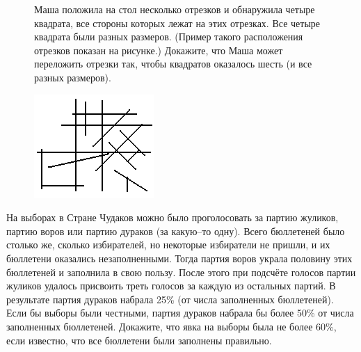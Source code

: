 \begin{figure}[h]
    \begin{minipage}{0.75\linewidth}
        \begin{thmF}
            Маша положила на стол несколько отрезков и обнаружила четыре квадрата, все стороны которых лежат на этих отрезках. Все четыре квадрата были разных размеров. (Пример такого расположения отрезков показан на рисунке.) Докажите, что Маша может переложить отрезки так, чтобы квадратов оказалось шесть (и все разных размеров).
        \end{thmF}
    \end{minipage}
\hfill
    \begin{minipage}{0.2\linewidth}
        \includegraphics[width=0.95\columnwidth]{img/10.8.0 img1.png}
    \end{minipage}
\end{figure}

\begin{thmF}
    На выборах в Стране Чудаков можно было проголосовать за партию жуликов, партию воров или партию дураков (за какую--то одну). Всего бюллетеней было столько же, сколько избирателей, но некоторые избиратели не пришли, и их бюллетени оказались незаполненными. Тогда партия воров украла половину этих бюллетеней и заполнила в свою пользу. После этого при подсчёте голосов партии жуликов удалось присвоить треть голосов за каждую из остальных партий. В результате партия дураков набрала 25\% (от числа заполненных бюллетеней). Если бы выборы были честными, партия дураков набрала бы более 50\% от числа заполненных бюллетеней. Докажите, что явка на выборы была не более 60\%, если известно, что все бюллетени были заполнены правильно.
\end{thmF}